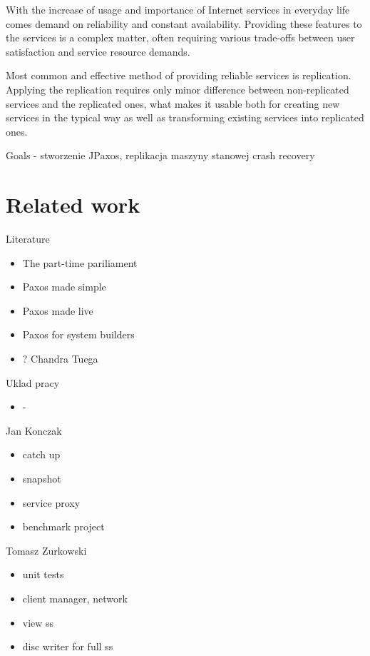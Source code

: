 
With the increase of usage and importance of Internet services in everyday life comes demand on reliability and constant availability.
Providing these features to the services is a complex matter, often requiring various trade-offs between user satisfaction and service resource demands.

Most common and effective method of providing reliable services is replication. Applying the replication requires only minor difference between non-replicated services and the replicated ones, what makes it usable both for creating new services in the typical way %
as well as transforming existing services into replicated ones.

Goals
- stworzenie JPaxos, replikacja maszyny stanowej crash recovery

\section{Related work}
Literature

\begin{itemize}
  \item The part-time pariliament
  \item Paxos made simple
  \item Paxos made live
  \item Paxos for system builders
  \item ? Chandra Tuega
\end{itemize}

Uklad pracy

\begin{itemize}
  \item -
\end{itemize}

Jan Konczak 

\begin{itemize}
  \item catch up 
  \item snapshot 
  \item service proxy
  \item benchmark project
\end{itemize}

Tomasz Zurkowski

\begin{itemize}
  \item unit tests
  \item client manager, network
  \item view ss
  \item disc writer for full ss
\end{itemize}
